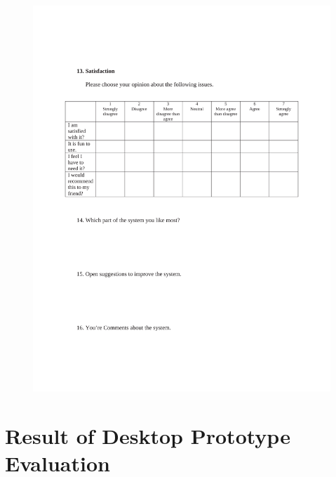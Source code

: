 \begin{appendices}
\begin{figure}[h!t]
    \centering
      \includegraphics[width=6in]{ch5/UsabilityQuestionnaire4.pdf}
  \label{UsabilityQuestionnaire4}
\end{figure}

\clearpage
\newpage
\section{Result of Desktop Prototype Evaluation}
\label{sec:ResultforDesktopPrototype}


\end{appendices}
